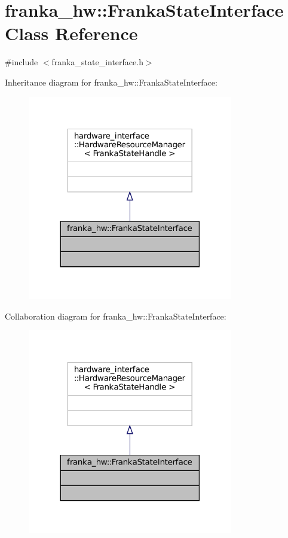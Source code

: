\hypertarget{classfranka__hw_1_1FrankaStateInterface}{}\section{franka\+\_\+hw\+:\+:Franka\+State\+Interface Class Reference}
\label{classfranka__hw_1_1FrankaStateInterface}


{\ttfamily \#include $<$franka\+\_\+state\+\_\+interface.\+h$>$}



Inheritance diagram for franka\+\_\+hw\+:\+:Franka\+State\+Interface\+:
\nopagebreak
\begin{figure}[H]
\begin{center}
\leavevmode
\includegraphics[width=254pt]{classfranka__hw_1_1FrankaStateInterface__inherit__graph}
\end{center}
\end{figure}


Collaboration diagram for franka\+\_\+hw\+:\+:Franka\+State\+Interface\+:
\nopagebreak
\begin{figure}[H]
\begin{center}
\leavevmode
\includegraphics[width=254pt]{classfranka__hw_1_1FrankaStateInterface__coll__graph}
\end{center}
\end{figure}


